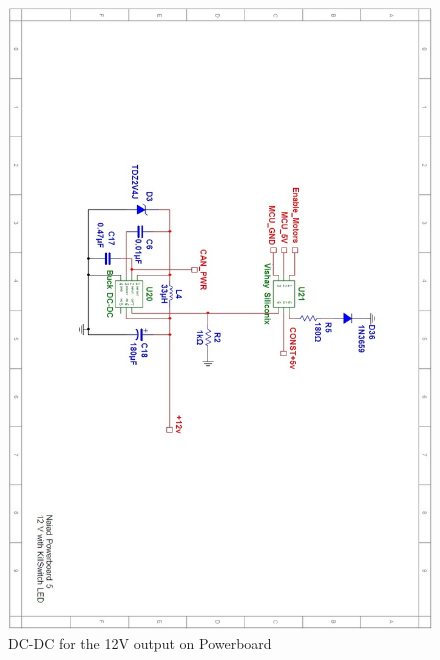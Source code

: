 \begin{figure}[!ht]
	\begin{center}
		\includegraphics[width=13.2cm]{./Images/Powerboard_Scematics/12V.jpg}
		\caption{DC-DC for the 12V output on Powerboard}
	\end{center}
\end{figure}

